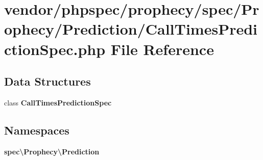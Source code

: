 \section{vendor/phpspec/prophecy/spec/\+Prophecy/\+Prediction/\+Call\+Times\+Prediction\+Spec.php File Reference}
\label{_call_times_prediction_spec_8php}
\subsection*{Data Structures}
\begin{DoxyCompactItemize}
\item 
class {\bf Call\+Times\+Prediction\+Spec}
\end{DoxyCompactItemize}
\subsection*{Namespaces}
\begin{DoxyCompactItemize}
\item 
 {\bf spec\textbackslash{}\+Prophecy\textbackslash{}\+Prediction}
\end{DoxyCompactItemize}
